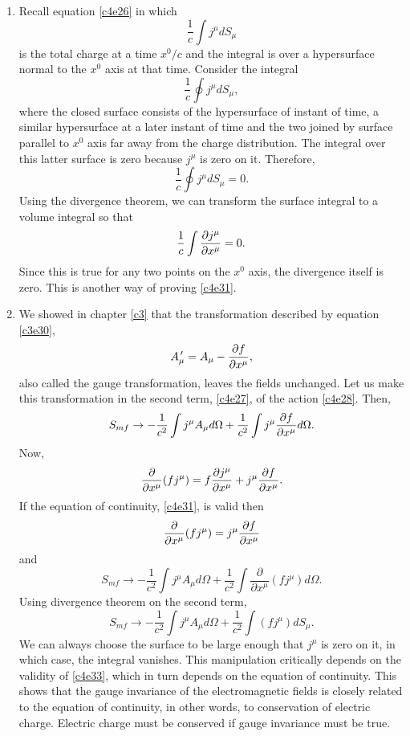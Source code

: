 \begin{enumerate}
\item Recall equation \eqref{c4e26} in which
\[
\frac{1}{c}\int j^\mu dS_\mu
\]
is the total charge at a time $x^0/c$ and the integral is over a hypersurface 
normal to the $x^0$ axis at that time. Consider the integral
\[
\frac{1}{c}\oint j^\mu dS_\mu,
\]
where the closed surface consists of the hypersurface of instant of time, a
similar hypersurface at a later instant of time and the two joined by surface
parallel to $x^0$ axis far away from the charge distribution. The integral over
this latter surface is zero because $j^\mu$ is zero on it. Therefore,
\begin{equation}\label{c4e32}
\frac{1}{c}\oint j^\mu dS_\mu = 0.
\end{equation}
Using the divergence theorem, we can transform the surface integral to a volume
integral so that
\[
\frac{1}{c}\int \frac{\partial{j^\mu}}{\partial{x^\mu}} = 0.
\]
Since this is true for any two points on the $x^0$ axis, the divergence itself
is zero. This is another way of proving \eqref{c4e31}.

\item We showed in chapter \ref{c3} that the transformation described by 
equation
\eqref{c3e30},
\[
A_\mu^{\,\prime} = A_\mu - \frac{\partial{f}}{\partial{x^\mu}},
\]
also called the gauge transformation, leaves the fields unchanged. Let us make 
this transformation in the second term, \eqref{c4e27}, of the action 
\eqref{c4e28}.  Then,
\[
S_{mf} \rightarrow -\frac{1}{c^2}\int j^\mu A_\mu d\Omega + \frac{1}{c^2}
\int j^\mu\frac{\partial{f}}{\partial{x^\mu}} d\Omega.
\]
Now,
\[
\frac{\partial}{\partial x^\mu}(fj^\mu) = f\frac{\partial{j^\mu}}{\partial{x^\mu}} + 
j^\mu\frac{\partial{f}}{\partial{x^\mu}}.
\]
If the equation of continuity, \eqref{c4e31}, is valid then
\begin{equation}\label{c4e33}
\frac{\partial}{\partial x^\mu}(fj^\mu) = j^\mu\frac{\partial{f}}{\partial{x^\mu}}
\end{equation}
and
\[
S_{mf} \rightarrow -\frac{1}{c^2}\int j^\mu A_\mu d\Omega + \frac{1}{c^2}
\int \frac{\partial}{\partial x^\mu}(fj^\mu) d\Omega.
\]
Using divergence theorem on the second term,
\[
S_{mf} \rightarrow -\frac{1}{c^2}\int j^\mu A_\mu d\Omega + \frac{1}{c^2}
\int (fj^\mu) dS_\mu.
\]
We can always choose the surface to be large enough that $j^\mu$ is zero on it,
in which case, the integral vanishes. This manipulation critically depends on 
the validity of \eqref{c4e33}, which in turn depends on the equation of 
continuity.  This shows that the gauge invariance of the electromagnetic 
fields is closely related to the equation of continuity, in other words, to 
conservation of electric charge. Electric charge must be conserved if gauge 
invariance must be true.


\end{enumerate}
